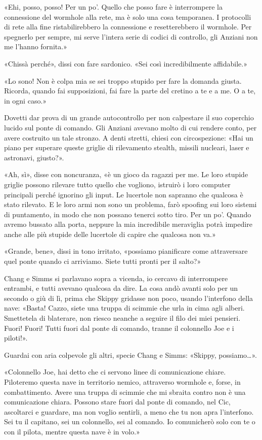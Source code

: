 «Ehi, posso, posso! Per un po'. Quello che posso fare è interrompere la
connessione del wormhole alla rete, ma è solo una cosa temporanea. I
protocolli di rete alla fine ristabilirebbero la connessione e
resetterebbero il wormhole. Per spegnerlo per sempre, mi serve l'intera
serie di codici di controllo, gli Anziani non me l'hanno fornita.»

«Chissà perché», dissi con fare sardonico. «Sei così incredibilmente
affidabile.»

«Lo sono! Non è colpa mia se sei troppo stupido per fare la domanda
giusta. Ricorda, quando fai supposizioni, fai fare la parte del cretino
a te e a me. O a te, in ogni caso.»

Dovetti dar prova di un grande autocontrollo per non calpestare il suo
coperchio lucido sul ponte di comando. Gli Anziani avevano molto di cui
rendere conto, per avere costruito un tale stronzo. A denti stretti,
chiesi con circospezione: «Hai un piano per superare queste griglie di
rilevamento stealth, missili nucleari, laser e astronavi, giusto?».

«Ah, sì», disse con noncuranza, «è un gioco da ragazzi per me. Le loro
stupide griglie possono rilevare tutto quello che vogliono, istruirò i
loro computer principali perché ignorino gli input. Le lucertole non
sapranno che qualcosa è stato rilevato. E le loro armi non sono un
problema, farò spoofing sui loro sistemi di puntamento, in modo che non
possano tenerci sotto tiro. Per un po'. Quando avremo bussato alla
porta, neppure la mia incredibile meraviglia potrà impedire anche alle
più stupide delle lucertole di capire che qualcosa non va.»

«Grande, bene», dissi in tono irritato, «possiamo pianificare come
attraversare quel ponte quando ci arriviamo. Siete tutti pronti per il
salto?»

Chang e Simms si parlavano sopra a vicenda, io cercavo di interrompere
entrambi, e tutti avevano qualcosa da dire. La cosa andò avanti solo per
un secondo o giù di lì, prima che Skippy gridasse non poco, usando
l'interfono della nave: «Basta! Cazzo, siete una truppa di scimmie che
urla in cima agli alberi. Smettetela di blaterare, non riesco neanche a
seguire il filo dei miei pensieri. Fuori! Fuori! Tutti fuori dal ponte
di comando, tranne il colonnello Joe e i piloti!».

Guardai con aria colpevole gli altri, specie Chang e Simms: «Skippy,
possiamo\ldots».

«Colonnello Joe, hai detto che ci servono linee di comunicazione chiare.
Piloteremo questa nave in territorio nemico, attraverso wormhole e,
forse, in combattimento. Avere una truppa di scimmie che mi sbraita
contro non è una comunicazione chiara. Possono stare fuori dal ponte di
comando, nel Cic, ascoltarci e guardare, ma non voglio sentirli, a meno
che tu non apra l'interfono. Sei tu il capitano, sei un colonnello, sei
al comando. Io comunicherò solo con te o con il pilota, mentre questa
nave è in volo.»


